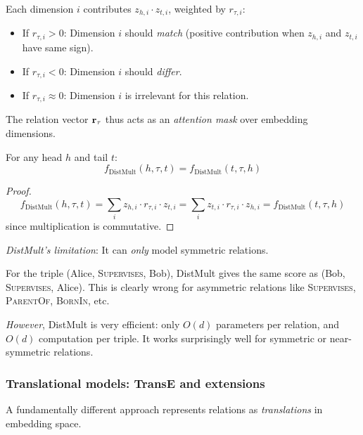 \begin{notechapter}
\begin{intuition}
Each dimension $i$ contributes $z_{h,i} \cdot z_{t,i}$, weighted by $r_{\tau,i}$:
\begin{itemize}
    \item If $r_{\tau,i} > 0$: Dimension $i$ should \emph{match} (positive contribution when $z_{h,i}$ and $z_{t,i}$ have same sign).
    \item If $r_{\tau,i} < 0$: Dimension $i$ should \emph{differ}.
    \item If $r_{\tau,i} \approx 0$: Dimension $i$ is irrelevant for this relation.
\end{itemize}

The relation vector $\mathbf{r}_\tau$ thus acts as an \emph{attention mask} over embedding dimensions.
\end{intuition}

\begin{proposition}
For any head $h$ and tail $t$:
\[
f_{\text{DistMult}}(h, \tau, t) = f_{\text{DistMult}}(t, \tau, h)
\]
\end{proposition}

\begin{proof}
\[
f_{\text{DistMult}}(h, \tau, t) = \sum_i z_{h,i} \cdot r_{\tau,i} \cdot z_{t,i} = \sum_i z_{t,i} \cdot r_{\tau,i} \cdot z_{h,i} = f_{\text{DistMult}}(t, \tau, h)
\]
since multiplication is commutative.
\end{proof}

\begin{keyidea}
\emph{DistMult's limitation}: It can \emph{only} model symmetric relations.

For the triple (Alice, \textsc{Supervises}, Bob), DistMult gives the same score as (Bob, \textsc{Supervises}, Alice). This is clearly wrong for asymmetric relations like \textsc{Supervises}, \textsc{ParentOf}, \textsc{BornIn}, etc.

\emph{However}, DistMult is very efficient: only $O(d)$ parameters per relation, and $O(d)$ computation per triple. It works surprisingly well for symmetric or near-symmetric relations.
\end{keyidea}


\subsubsection{Translational models: TransE and extensions}

A fundamentally different approach represents relations as \emph{translations} in embedding space.


\end{notechapter}
